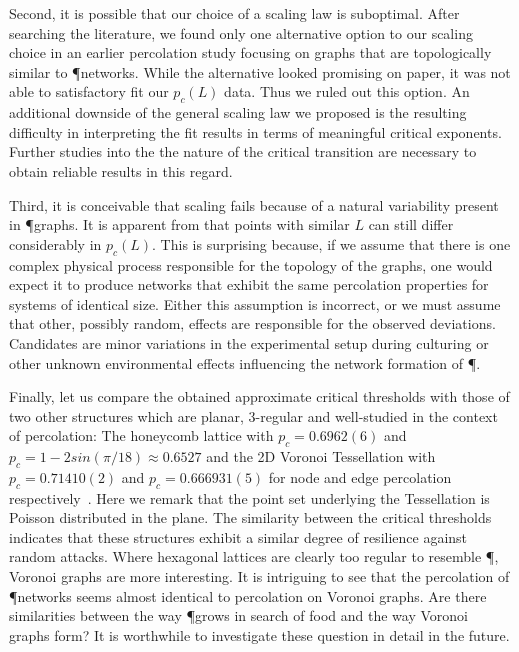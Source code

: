 		Second, it is possible that our choice of a scaling law is suboptimal. After searching the literature, we found only one alternative option to our scaling choice in an earlier percolation study focusing on graphs that are topologically similar to \P networks. While the alternative looked promising on paper, it was not able to satisfactory fit our $p_c(L)$ data. Thus we ruled out this option. An additional downside of the general scaling law we proposed is the resulting difficulty in interpreting the fit results in terms of meaningful critical exponents. Further studies into the the nature of the critical transition are necessary to obtain reliable results in this regard.

		Third, it is conceivable that scaling fails because of a natural variability present in \P graphs. It is apparent from  that points with similar $L$ can still differ considerably in $p_c(L)$. This is surprising because, if we assume that there is one complex physical process responsible for the topology of the graphs, one would expect it to produce networks that exhibit the same percolation properties for systems of identical size. Either this assumption is incorrect, or we must assume that other, possibly random, effects are responsible for the observed deviations. Candidates are minor variations in the experimental setup during culturing or other unknown environmental effects influencing the network formation of \P.

		Finally, let us compare the obtained approximate critical thresholds with those of two other structures which are planar, $3$-regular and well-studied in the context of percolation: The honeycomb lattice with $p_c = 0.6962(6)$ and $p_c = 1-2 sin (\pi/18) \approx 0.6527$ and the 2D Voronoi Tessellation with $p_c = 0.71410(2)$ and $p_c = 0.666931(5)$ for node and edge percolation respectively~\cite{djordjevic1982site,becker2009percolation}. Here we remark that the point set underlying the Tessellation is Poisson distributed in the plane. The similarity between the critical thresholds indicates that these structures exhibit a similar degree of resilience against random attacks. Where hexagonal lattices are clearly too regular to resemble \P, Voronoi graphs are more interesting. It is intriguing to see that the percolation of \P networks seems almost identical to percolation on Voronoi graphs. Are there similarities between the way \P grows in search of food and the way Voronoi graphs form? It is worthwhile to investigate these question in detail in the future.	


